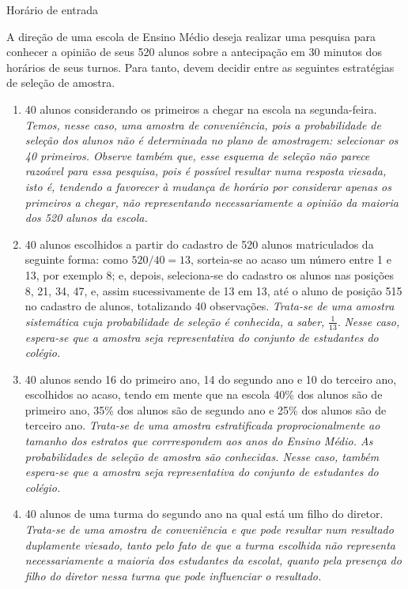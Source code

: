 \begin{example}{Horário de entrada}

A direção de uma escola de Ensino Médio deseja realizar uma pesquisa para conhecer a opinião de seus 520 alunos sobre a antecipação em 30 minutos dos horários de seus turnos. Para tanto, devem decidir entre as seguintes estratégias de seleção de amostra.
\begin{enumerate}
\item {} 
40 alunos considerando os primeiros a chegar na  escola na segunda-feira.  \emph{Temos, nesse caso, uma amostra de conveniência, pois a probabilidade de seleção dos alunos não é determinada no plano de amostragem: selecionar os 40 primeiros. Observe também que, esse esquema de seleção não parece razoável para essa pesquisa, pois é possível resultar numa resposta viesada, isto é, tendendo a favorecer à mudança de horário por considerar apenas os primeiros a chegar, não representando necessariamente a opinião da maioria dos 520 alunos da escola.}

\item {} 
40 alunos escolhidos a partir do cadastro de 520 alunos matriculados da seguinte forma: como \(520/40=13\), sorteia-se ao acaso um número entre 1 e 13, por exemplo 8; e, depois, seleciona-se do cadastro os alunos nas posições 8, 21, 34, 47,  e, assim sucessivamente de 13 em 13, até o aluno de posição 515 no cadastro de alunos, totalizando 40 observações. \emph{Trata-se de uma amostra sistemática cuja probabilidade de seleção é conhecida, a saber,} \(\frac{1}{13}\). \emph{Nesse caso, espera-se que a amostra seja representativa do conjunto de estudantes do colégio.}

\item {} 
40 alunos sendo 16 do primeiro ano, 14 do segundo ano e 10 do terceiro ano, escolhidos ao acaso, tendo em mente que na escola 40\% dos alunos são de primeiro ano, 35\% dos alunos são de segundo ano e 25\% dos alunos são de terceiro ano. \emph{Trata-se de uma amostra estratificada proprocionalmente ao tamanho dos estratos que corrrespondem aos anos do Ensino Médio. As probabilidades de seleção de amostra são conhecidas.  Nesse caso, também espera-se que a amostra seja representativa do conjunto de estudantes do colégio.}

\item {} 
40 alunos de uma turma do segundo ano na qual está um filho do diretor. \emph{Trata-se de uma amostra de conveniência e que pode resultar num resultado duplamente viesado, tanto pelo fato de que a turma escolhida não representa necessariamente a maioria dos estudantes da escolat, quanto pela presença do filho do diretor nessa turma que pode influenciar o resultado.}

\end{enumerate}
\end{example}


